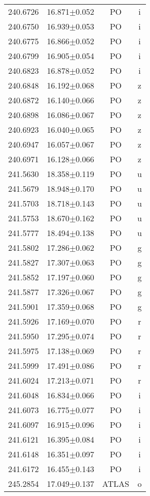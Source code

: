 \begin{table}
\begin{tabular}{cccc}
240.6726 & 16.871$\pm$0.052 & PO & i \\
240.6750 & 16.939$\pm$0.053 & PO & i \\
240.6775 & 16.866$\pm$0.052 & PO & i \\
240.6799 & 16.905$\pm$0.054 & PO & i \\
240.6823 & 16.878$\pm$0.052 & PO & i \\
240.6848 & 16.192$\pm$0.068 & PO & z \\
240.6872 & 16.140$\pm$0.066 & PO & z \\
240.6898 & 16.086$\pm$0.067 & PO & z \\
240.6923 & 16.040$\pm$0.065 & PO & z \\
240.6947 & 16.057$\pm$0.067 & PO & z \\
240.6971 & 16.128$\pm$0.066 & PO & z \\
241.5630 & 18.358$\pm$0.119 & PO & u \\
241.5679 & 18.948$\pm$0.170 & PO & u \\
241.5703 & 18.718$\pm$0.143 & PO & u \\
241.5753 & 18.670$\pm$0.162 & PO & u \\
241.5777 & 18.494$\pm$0.138 & PO & u \\
241.5802 & 17.286$\pm$0.062 & PO & g \\
241.5827 & 17.307$\pm$0.063 & PO & g \\
241.5852 & 17.197$\pm$0.060 & PO & g \\
241.5877 & 17.326$\pm$0.067 & PO & g \\
241.5901 & 17.359$\pm$0.068 & PO & g \\
241.5926 & 17.169$\pm$0.070 & PO & r \\
241.5950 & 17.295$\pm$0.074 & PO & r \\
241.5975 & 17.138$\pm$0.069 & PO & r \\
241.5999 & 17.491$\pm$0.086 & PO & r \\
241.6024 & 17.213$\pm$0.071 & PO & r \\
241.6048 & 16.834$\pm$0.066 & PO & i \\
241.6073 & 16.775$\pm$0.077 & PO & i \\
241.6097 & 16.915$\pm$0.096 & PO & i \\
241.6121 & 16.395$\pm$0.084 & PO & i \\
241.6148 & 16.351$\pm$0.097 & PO & i \\
241.6172 & 16.455$\pm$0.143 & PO & i \\
245.2854 & 17.049$\pm$0.137 & ATLAS & o \\

\end{tabular}
\end{table}
